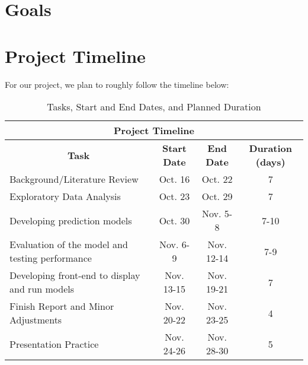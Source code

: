 \documentclass[11pt, letterpaper]{article}
\begin{document}
    \section{Goals}

    \section*{Project Timeline}
    For our project, we plan to roughly follow the timeline below:

    \begin{table}[h]
        \centering
        \begin{tabular}{l|c|c|c}
            \hline \hline
            \multicolumn{4}{c}{\textbf{Project Timeline}} \\ %
            \hline \hline
            \multicolumn{1}{c|}{\textbf{Task}} & \textbf{Start Date} & \textbf{End Date} & \textbf{Duration (days)} \\
            \hline
            Background/Literature Review & Oct. 16 & Oct. 22 & 7 \\
            \hline
            Exploratory Data Analysis & Oct. 23 & Oct. 29 & 7 \\
            \hline
            Developing prediction models & Oct. 30 & Nov. 5-8 & 7-10 \\
            \hline
            Evaluation of the model and testing performance & Nov. 6-9 & Nov. 12-14 & 7-9 \\
            \hline
            Developing front-end to display and run models & Nov. 13-15 & Nov. 19-21 & 7 \\
            \hline
            Finish Report and Minor Adjustments & Nov. 20-22 & Nov. 23-25 & 4 \\
            \hline
            Presentation Practice & Nov. 24-26 & Nov. 28-30 & 5 \\
            \hline \hline
        \end{tabular}
        \caption{Tasks, Start and End Dates, and Planned Duration}
        \label{tab:timeline}
    \end{table}
\end{document}
